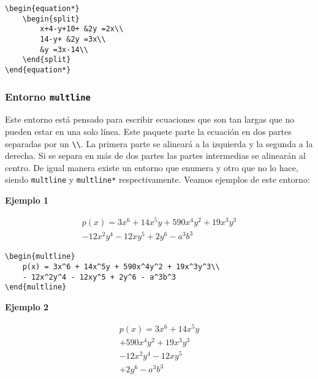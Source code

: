 \begin{myquote}
	\begin{lstlisting}
\begin{equation*}
	\begin{split}
		x+4-y+10+ &2y =2x\\
		14-y+ &2y =3x\\
		&y =3x-14\\
	\end{split}
\end{equation*}
	\end{lstlisting}
\end{myquote}

\subsubsection{Entorno \texttt{multline}}

Este entorno está pensado para escribir ecuaciones que son tan largas que no pueden estar en una solo línea. Este paquete parte la ecuación en dos partes separadas por un \verb|\\|. La primera parte se alineará a la izquierda y la segunda a la derecha. Si se separa en más de dos partes las partes intermedias se alinearán al centro. De igual manera existe un entorno que enumera y otro que no lo hace, siendo \texttt{multline} y \texttt{multline*} respectivamente. Veamos ejemplos de este entorno:

\textbf{Ejemplo 1}

\begin{multline}
p(x) = 3x^6 + 14x^5y + 590x^4y^2 + 19x^3y^3\\ 
- 12x^2y^4 - 12xy^5 + 2y^6 - a^3b^3
\end{multline}

\begin{myquote}
	\begin{lstlisting}
\begin{multline}
	p(x) = 3x^6 + 14x^5y + 590x^4y^2 + 19x^3y^3\\ 
	- 12x^2y^4 - 12xy^5 + 2y^6 - a^3b^3
\end{multline}
	\end{lstlisting}
\end{myquote}

\textbf{Ejemplo 2}

\begin{multline*}
p(x) = 3x^6 + 14x^5y\\
+ 590x^4y^2 + 19x^3y^3\\
- 12x^2y^4 - 12xy^5\\
+ 2y^6 - a^3b^3
\end{multline*}

